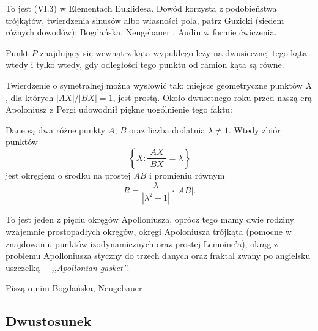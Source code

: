 To jest (VI.3) w Elementach Euklidesa.
Dowód korzysta z podobieństwa trójkątów, twierdzenia sinusów albo własności pola, patrz Guzicki \cite[s. 120]{guzicki_2021} (siedem różnych dowodów); Bogdańska, Neugebauer \cite[s. 73]{neugebauer_2018}, Audin \cite[s. 102]{audin_2003} w formie ćwiczenia.

\begin{proposition} %
	Punkt $P$ znajdujący się wewnątrz kąta wypukłego leży na dwusiecznej tego kąta wtedy i tylko wtedy, gdy odległości tego punktu od ramion kąta są równe.
\end{proposition}




Twierdzenie o symetralnej %
można wysłowić tak: miejsce geometryczne punktów $X$, dla których $|AX|/|BX| = 1$, jest prostą.
Około dwusetnego roku przed naszą erą Apoloniusz z Pergi udowodnił piękne uogólnienie tego faktu:

\begin{definition} %
	Dane są dwa różne punkty $A$, $B$ oraz liczba dodatnia $\lambda \neq 1$.
	Wtedy zbiór punktów 
	\begin{equation}
		\left\{X : \frac{|AX|}{|BX|} = \lambda \right\}
	\end{equation}
	jest okręgiem o środku na prostej $AB$ i promieniu równym
	\begin{equation}
		R = \frac{\lambda}{|\lambda^2 - 1|} \cdot |AB|.
	\end{equation}
\end{definition}

To jest jeden z pięciu okręgów Apolloniusza, oprócz tego mamy dwie rodziny wzajemnie prostopadłych okręgów, okręgi Apoloniusza trójkąta (pomocne w znajdowaniu punktów izodynamicznych oraz prostej Lemoine'a), okrąg z problemu Apolloniusza styczny do trzech danych oraz fraktal zwany po angielsku uszczelką -- \emph{,,Apollonian gasket''}.

Piszą o nim Bogdańska, Neugebauer \cite[s. 74]{neugebauer_2018}



\subsection{Dwustosunek}

